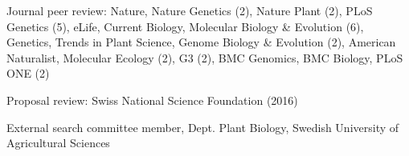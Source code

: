 \documentclass[letterpaper]{article}
\newcommand{\ignore}[1]{}
\renewenvironment{itemize}{
  \begin{list}{}{
    \setlength{\leftmargin}{1.5em}
  }
}{
  \end{list}
}
\begin{document}
\begin{itemize}
\item Journal peer review: \ignore{7/15} Nature, \ignore{1/14, 3/14} Nature Genetics (2), \ignore{6/15,7/15}  Nature Plant (2), \ignore{4/14,4/14,8/14,12/14,5/15} PLoS Genetics (5), \ignore{1/15} eLife, \ignore{9/15} Current Biology, \ignore{9/15,7/14,7/14,5/15,6/15,7/15} Molecular Biology \& Evolution (6), \ignore{7/15} Genetics, \ignore{9/2015} Trends in Plant Science, \ignore{12/14,6/15} Genome Biology \& Evolution (2), \ignore {3/14} American Naturalist, \ignore{1/14,1/15} Molecular Ecology (2), \ignore{2/15,6/15} G3 (2), \ignore{1/14} BMC Genomics, \ignore{10/14} BMC Biology, \ignore{1/15,6/15} PLoS ONE (2)
\item Proposal review: Swiss National Science Foundation (2016)
\item External search committee member, Dept. Plant Biology, Swedish University of Agricultural Sciences 
\end{itemize}

\end{document}
